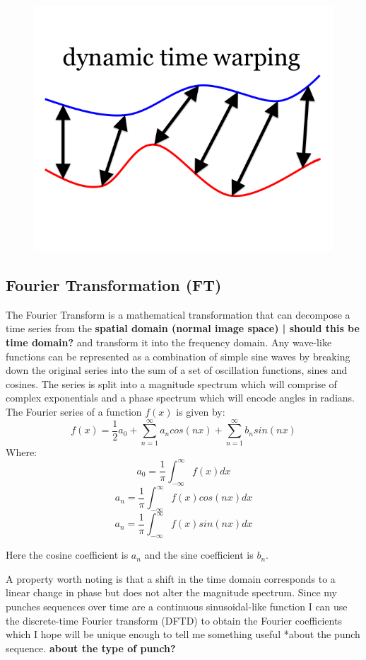 \begin{figure}[h]
    \centering
    \includegraphics[height=0.25\textheight]{fig02/dtw}
    \label{fig:kinect}
\end{figure}


\subsection{Fourier Transformation (FT)}
The Fourier Transform is a mathematical transformation that can decompose a time series from the {\bf spatial domain (normal image space) | should this be time domain?} and transform it into the frequency domain. Any wave-like functions can be represented as a combination of simple sine waves by breaking down the original series into the sum of a set of oscillation functions, sines and cosines. The series is split into a magnitude spectrum which will comprise of complex exponentials and a phase spectrum which will encode angles in radians. 
The Fourier series of a function $f(x)$ is given by:
$$f(x)=\frac{1}{2}a_0 + \sum_{n=1}^\infty a_n cos(nx) + \sum_{n=1}^\infty b_n sin(nx)$$
Where:
$$a_0 = \frac{1}{\pi}\int_{-\infty}^\infty f(x)dx$$
$$a_n = \frac{1}{\pi}\int_{-\infty}^\infty f(x)cos(nx)dx$$
$$a_n = \frac{1}{\pi}\int_{-\infty}^\infty f(x)sin(nx)dx$$

Here the cosine coefficient is $a_n$ and the sine coefficient is $b_n$.

A property worth noting is that a shift in the time domain corresponds to a linear change in phase but does not alter the magnitude spectrum. Since my punches sequences over time are a continuous sinusoidal-like function I can use the discrete-time Fourier transform (DFTD) to obtain the Fourier coefficients which I hope will be unique enough to tell me something useful *about the punch sequence. {\bf* about the type of punch? }

